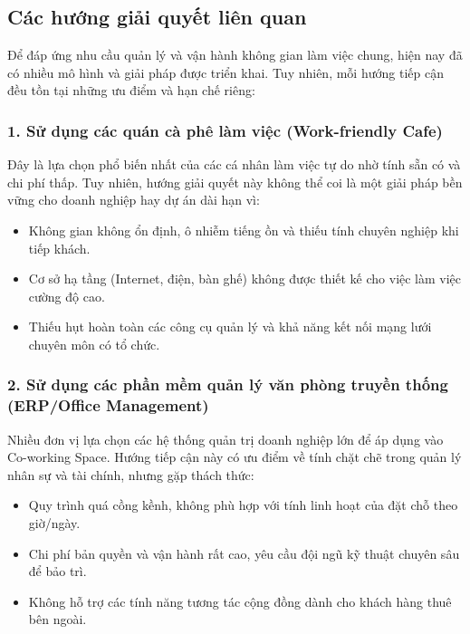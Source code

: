\subsection{Các hướng giải quyết liên quan}

Để đáp ứng nhu cầu quản lý và vận hành không gian làm việc chung, hiện nay đã có nhiều mô hình và giải pháp được triển khai. Tuy nhiên, mỗi hướng tiếp cận đều tồn tại những ưu điểm và hạn chế riêng:

\subsubsection*{1. Sử dụng các quán cà phê làm việc (Work-friendly Cafe)}
Đây là lựa chọn phổ biến nhất của các cá nhân làm việc tự do nhờ tính sẵn có và chi phí thấp. Tuy nhiên, hướng giải quyết này không thể coi là một giải pháp bền vững cho doanh nghiệp hay dự án dài hạn vì:
\begin{itemize}
\item Không gian không ổn định, ô nhiễm tiếng ồn và thiếu tính chuyên nghiệp khi tiếp khách.
\item Cơ sở hạ tầng (Internet, điện, bàn ghế) không được thiết kế cho việc làm việc cường độ cao.
\item Thiếu hụt hoàn toàn các công cụ quản lý và khả năng kết nối mạng lưới chuyên môn có tổ chức.
\end{itemize}

\subsubsection*{2. Sử dụng các phần mềm quản lý văn phòng truyền thống (ERP/Office Management)}
Nhiều đơn vị lựa chọn các hệ thống quản trị doanh nghiệp lớn để áp dụng vào Co-working Space. Hướng tiếp cận này có ưu điểm về tính chặt chẽ trong quản lý nhân sự và tài chính, nhưng gặp thách thức:
\begin{itemize}
\item Quy trình quá cồng kềnh, không phù hợp với tính linh hoạt của đặt chỗ theo giờ/ngày.
\item Chi phí bản quyền và vận hành rất cao, yêu cầu đội ngũ kỹ thuật chuyên sâu để bảo trì.
\item Không hỗ trợ các tính năng tương tác cộng đồng dành cho khách hàng thuê bên ngoài.
\end{itemize}

